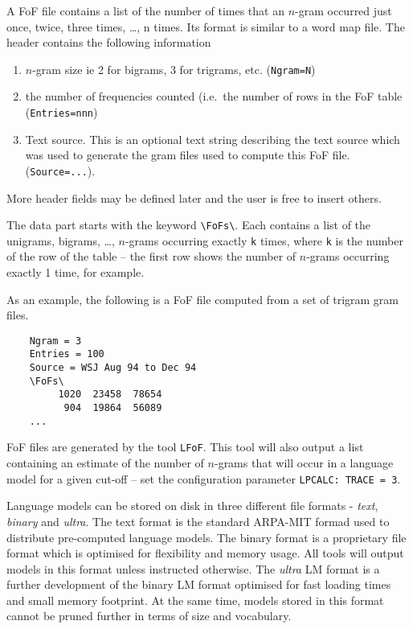 
A FoF file contains a list of the number of times that an $n$-gram
occurred just once, twice, three times, \ldots, n times.  Its format
is similar to a word map file.  The header contains the following
information
\begin{enumerate}
\item $n$-gram size ie 2 for bigrams, 3 for trigrams, etc. (\texttt{Ngram=N})
\item the number of frequencies counted (i.e.\ the number of rows in the
      FoF table (\texttt{Entries=nnn})
\item Text source.  This is an optional text string describing the text source 
which was used to generate the gram files used to compute this
FoF file. (\texttt{Source=...}).
\end{enumerate}
More header fields may be defined later and the user is free to insert
others.

The data part starts with the keyword \verb+\FoFs\+.  Each 
contains a list of the unigrams, bigrams, \ldots, $n$-grams occurring exactly
\texttt{k} times, where \texttt{k} is the number of the row of the
table -- the first row shows the number of $n$-grams occurring exactly
1 time, for example.

As an example, the following is a FoF file computed from a set of trigram gram
files.
\begin{verbatim}
    Ngram = 3
    Entries = 100
    Source = WSJ Aug 94 to Dec 94
    \FoFs\
         1020  23458  78654
          904  19864  56089
    ...
\end{verbatim}

FoF files are generated by the tool \texttt{LFoF}.  This tool will
also output a list containing an estimate of the number of $n$-grams that
will occur in a language model for a given cut-off -- set the
configuration parameter {\tt LPCALC: TRACE = 3}.


Language models can be stored on disk in three different file formats
- {\em text}, {\em binary} and {\em ultra}. The text format is the
standard ARPA-MIT formad used to distribute pre-computed language
models.  The binary format is a proprietary file format which is
optimised for flexibility and memory usage.  All tools will output
models in this format unless instructed otherwise.  The {\em ultra} LM
format is a further development of the binary LM format optimised for
fast loading times and small memory footprint. At the same time,
models stored in this format cannot be pruned further in terms of size
and vocabulary.

